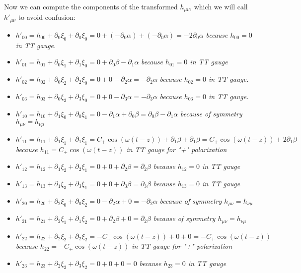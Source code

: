 \documentclass{article}
\begin{document}
Now we can compute the components of the transformed $h_{\mu \nu}$, which we will call $h'_{\mu\nu}$ to avoid confusion:

\begin{itemize}
    \item $h'_{00} = h_{00} + \partial_{0}\xi_{0}+\partial_{0}\xi_{0} = 0 + (-\partial_0 \alpha) + (-\partial_0 \alpha) = -2\partial_0 \alpha$ \emph{because $h_{00}=0$ in TT gauge.}
    \item $h'_{01} = h_{01} + \partial_0 \xi_1 + \partial_1 \xi_0 = 0 + \partial_0 \beta - \partial_1 \alpha$ \emph{because $h_{01}=0$ in TT gauge}
    \item $h'_{02} = h_{02} + \partial_0 \xi_2 + \partial_2 \xi_0 = 0 + 0 -\partial_2 \alpha = -\partial_2 \alpha$ \emph{because $h_{02}=0$ in TT gauge.}
    \item $h'_{03} = h_{03} + \partial_0 \xi_3 + \partial_3 \xi_0 = 0 + 0 -\partial_3 \alpha= -\partial_3 \alpha$ \emph{because $h_{03}=0$ in TT gauge.}
    \item $h'_{10} = h_{10} + \partial_1 \xi_0 + \partial_0 \xi_1 = 0 - \partial_1 \alpha + \partial_0 \beta = \partial_0 \beta - \partial_1 \alpha $ \emph{because of symmetry $h_{\mu\nu}=h_{\nu\mu}$}
    \item $h'_{11} = h_{11} + \partial_1 \xi_1 + \partial_1 \xi_1= C_{+} \cos(\omega(t-z)) + \partial_1 \beta + \partial_1 \beta = C_{+} \cos(\omega(t-z)) + 2\partial_1 \beta$ \emph{because $h_{11}=C_{+}\cos(\omega(t-z))$ in TT gauge for "+" polarization}
    \item $h'_{12} = h_{12} + \partial_1 \xi_2 + \partial_2 \xi_1 = 0 + 0 + \partial_2 \beta = \partial_2 \beta$ \emph{because $h_{12}=0$ in TT gauge}
    \item $h'_{13} = h_{13} + \partial_1 \xi_3 + \partial_3 \xi_1 = 0 + 0 + \partial_3 \beta = \partial_3 \beta$ \emph{because $h_{13}=0$ in TT gauge}
    \item $h'_{20} = h_{20} + \partial_2 \xi_0 + \partial_0 \xi_2 = 0 -\partial_2 \alpha + 0= -\partial_2 \alpha$ \emph{because of symmetry $h_{\mu\nu}=h_{\nu\mu}$}
    \item $h'_{21} = h_{21} + \partial_2 \xi_1 + \partial_1 \xi_2 = 0 + \partial_2 \beta + 0 = \partial_2 \beta$ \emph{because of symmetry $h_{\mu\nu}=h_{\nu\mu}$}
    \item $h'_{22} = h_{22} + \partial_2 \xi_2 + \partial_2 \xi_2= -C_{+} \cos(\omega(t-z)) + 0 + 0= -C_{+} \cos(\omega(t-z))$ \emph{because $h_{22}=-C_{+}\cos(\omega(t-z))$ in TT gauge for "+" polarization}
    \item $h'_{23} = h_{23} + \partial_2 \xi_3 + \partial_3 \xi_2 = 0 + 0 + 0 = 0$ \emph{because $h_{23}=0$ in TT gauge}

\end{itemize}
\end{document}
